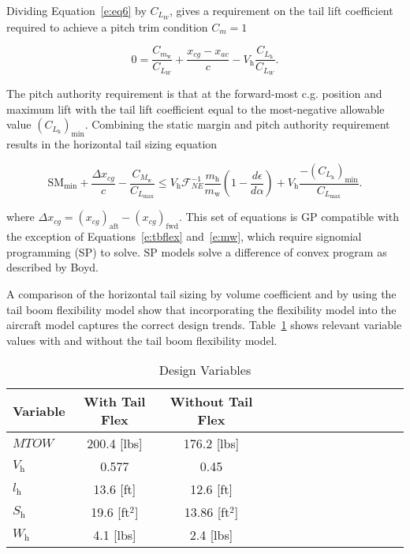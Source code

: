 \documentclass[]{aiaa-tc}%
\begin{document}
Dividing Equation~\eqref{e:eq6} by $C_{L_W}$, gives a requirement on the tail lift coefficient required to achieve a pitch trim condition $C_m=1$

\begin{equation}
    0 = \frac{C_{m_{\text{w}}}}{C_{L_W}} + \frac{x_{cg} - x_{ac}}{c} - V_{\text{h}} \frac{C_{L_{\text{h}}}}{C_{L_W}}.
\end{equation}

The pitch authority requirement is that at the forward-most c.g. position and maximum lift with the tail lift coefficient equal to the most-negative allowable value $(C_{L_{\text{h}}})_{\text{min}}$. Combining the static margin and pitch authority requirement results in the horizontal tail sizing equation 

\begin{equation}
    \label{e:tbflex}
    \text{SM}_{\text{min}} + \frac{\Delta x_{cg}}{c} - \frac{C_{M_{\text{w}}}}{C_{L_{\text{max}}}} \leq V_{\text{h}} \mathcal{F}_{NE}^{-1} \frac{m_{\text{h}}}{m_{\text{w}}} \left( 1 - \frac{d\epsilon}{d\alpha}\right) + V_{\text{h}} \frac{-(C_{L_{\text{h}}})_{\text{min}}}{C_{L_{\text{max}}}}.
\end{equation}

where $\Delta x_{cg} = (x_{cg})_{\text{aft}} - (x_{cg})_{\text{fwd}}$. 
This set of equations is GP compatible with the exception of Equations~\ref{e:tbflex} and~\ref{e:mw}, which require signomial programming (SP) to solve.  
SP models solve a difference of convex program as described by Boyd. 

A comparison of the horizontal tail sizing by volume coefficient and by using the tail boom flexibility model show that incorporating the flexibility model into the aircraft model captures the correct design trends.  
Table~\ref{t:tbflex} shows relevant variable values with and without the tail boom flexibility model.  

\begin{longtable}{lccccccccccccc}
    \caption{Design Variables}\\
    \toprule
    \toprule
    \label{t:tbflex}
    Variable           & With Tail Flex     & Without Tail Flex \\ \hline
    $MTOW$             & 200.4 [lbs]        & 176.2 [lbs]       \\
    $V_{\mathrm{h}}$   & 0.577              & 0.45              \\
    $l_{\mathrm{h}}$   & 13.6 [ft]          & 12.6 [ft]         \\
    $S_{\mathrm{h}}$   & 19.6 [ft$^2$]      & 13.86 [ft$^2$]    \\
    $W_{\mathrm{h}}$   & 4.1 [lbs]          & 2.4 [lbs]         \\
    \bottomrule
\end{longtable}
\end{document}
